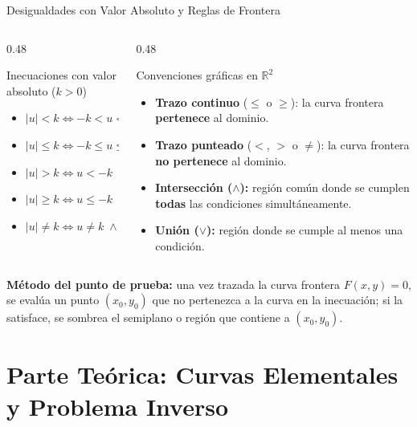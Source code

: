 \documentclass[aspectratio=169, 10pt]{beamer}
\begin{document}
\begin{frame}{Desigualdades con Valor Absoluto y Reglas de Frontera}
  \begin{columns}[T]
    \begin{column}{0.48\textwidth}
      \begin{block}{Inecuaciones con valor absoluto ($k > 0$)}
        \begin{itemize}
          \item $|u| < k \iff -k < u < k$
          \item $|u| \le k \iff -k \le u \le k$
          \item $|u| > k \iff u < -k \;\vee\; u > k$
          \item $|u| \ge k \iff u \le -k \;\vee\; u \ge k$
          \item $|u| \neq k \iff u \neq k \;\wedge\; u \neq -k$
        \end{itemize}
      \end{block}
    \end{column}
    \begin{column}{0.48\textwidth}
      \begin{block}{Convenciones gráficas en $\mathbb{R}^2$}
        \begin{itemize}
          \item \textbf{Trazo continuo} ($\le$ o $\ge$): la curva frontera \textbf{pertenece} al dominio.
          \item \textbf{Trazo punteado} ($<$, $>$ o $\neq$): la curva frontera \textbf{no pertenece} al dominio.
          \item \textbf{Intersección ($\wedge$):} región común donde se cumplen \textbf{todas} las condiciones simultáneamente.
          \item \textbf{Unión ($\vee$):} región donde se cumple al menos una condición.
        \end{itemize}
      \end{block}
    \end{column}
  \end{columns}

  \vspace{0.3cm}
  \textbf{Método del punto de prueba:} una vez trazada la curva frontera $F(x,y) = 0$, se evalúa un punto $(x_0, y_0)$ que no pertenezca a la curva en la inecuación; si la satisface, se sombrea el semiplano o región que contiene a $(x_0, y_0)$.
\end{frame}

\section{Parte Teórica: Curvas Elementales y Problema Inverso}
\end{document}
